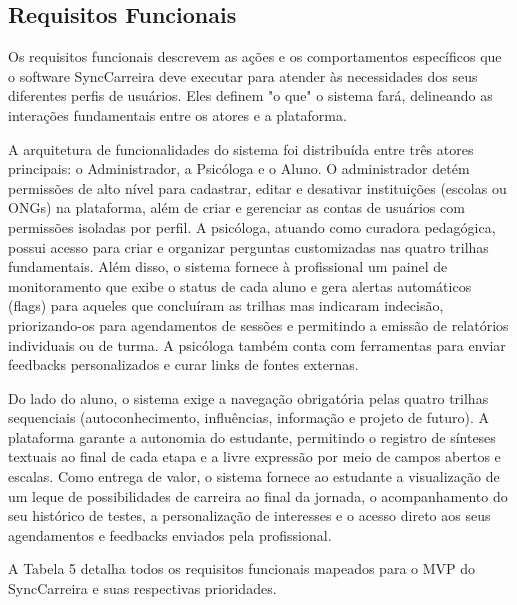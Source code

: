 \subsection{Requisitos Funcionais}

Os requisitos funcionais descrevem as ações e os comportamentos específicos que o software SyncCarreira deve executar para atender às necessidades dos seus diferentes perfis de usuários. Eles definem "o que" o sistema fará, delineando as interações fundamentais entre os atores e a plataforma.

A arquitetura de funcionalidades do sistema foi distribuída entre três atores principais: o Administrador, a Psicóloga e o Aluno. O administrador detém permissões de alto nível para cadastrar, editar e desativar instituições (escolas ou ONGs) na plataforma, além de criar e gerenciar as contas de usuários com permissões isoladas por perfil. A psicóloga, atuando como curadora pedagógica, possui acesso para criar e organizar perguntas customizadas nas quatro trilhas fundamentais. Além disso, o sistema fornece à profissional um painel de monitoramento que exibe o status de cada aluno e gera alertas automáticos (flags) para aqueles que concluíram as trilhas mas indicaram indecisão, priorizando-os para agendamentos de sessões e permitindo a emissão de relatórios individuais ou de turma. A psicóloga também conta com ferramentas para enviar feedbacks personalizados e curar links de fontes externas.

Do lado do aluno, o sistema exige a navegação obrigatória pelas quatro trilhas sequenciais (autoconhecimento, influências, informação e projeto de futuro). A plataforma garante a autonomia do estudante, permitindo o registro de sínteses textuais ao final de cada etapa e a livre expressão por meio de campos abertos e escalas. Como entrega de valor, o sistema fornece ao estudante a visualização de um leque de possibilidades de carreira ao final da jornada, o acompanhamento do seu histórico de testes, a personalização de interesses e o acesso direto aos seus agendamentos e feedbacks enviados pela profissional.

A Tabela 5 detalha todos os requisitos funcionais mapeados para o MVP do SyncCarreira e suas respectivas prioridades. 

